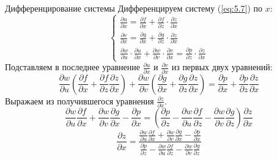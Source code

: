 \begin{tbox}{Дифференцирование системы}
	Дифференцируем систему (\ref{eq:5.7}) по $x$:
	\begin{equation*}
		\begin{cases}
			\frac{\partial u}{\partial x} = \frac{\partial f}{\partial x} + \frac{\partial f}{\partial z} \cdot \frac{\partial z}{\partial x} \\
			\frac{\partial v}{\partial x} = \frac{\partial g}{\partial x} + \frac{\partial g}{\partial z} \cdot \frac{\partial z}{\partial x} \\
			\frac{\partial w}{\partial u} \cdot \frac{\partial u}{\partial x} + \frac{\partial w}{\partial v} \cdot \frac{\partial v}{\partial x} = \frac{\partial p}{\partial z} \cdot \frac{\partial z}{\partial x}
		\end{cases}
	\end{equation*}
	Подставляем в последнее уравнение $\frac{\partial u}{\partial x}$ и $\frac{\partial v}{\partial x}$ из первых двух уравнений:
	\begin{equation*}
		\frac{\partial w}{\partial u} \left(\frac{\partial f}{\partial x} + \frac{\partial f}{\partial z} \frac{\partial z}{\partial x}\right) + \frac{\partial w }{\partial v}\left(\frac{\partial g}{\partial x} + \frac{\partial g}{\partial z} \frac{\partial z}{\partial x}\right) = \frac{\partial p}{\partial x} + \frac{\partial p}{\partial z} \frac{\partial z}{\partial x}
	\end{equation*}
	Выражаем из получившегося уравнения $\frac{\partial z}{\partial x}$.
	\begin{equation*}
		\frac{\partial w}{\partial u} \frac{\partial f}{\partial x} + \frac{\partial w}{\partial v} \frac{\partial g}{\partial x} - \frac{\partial p}{\partial x} = \left(\frac{\partial p}{\partial z} - \frac{\partial w}{\partial u} \frac{\partial f}{\partial z} - \frac{\partial w}{\partial v} \frac{\partial g}{\partial z}\right) \frac{\partial z}{\partial x}
	\end{equation*}
	\begin{equation} \label{eq:5.8}
		\frac{\partial z}{\partial x} = \frac{\displaystyle\frac{\partial w}{\partial u} \frac{\partial f}{\partial x} + \frac{\partial w}{\partial v} \frac{\partial g}{\partial x} - \frac{\partial p}{\partial x}}{\displaystyle\frac{\partial p}{\partial z} - \frac{\partial w}{\partial u} \frac{\partial f}{\partial z} - \frac{\partial w}{\partial v} \frac{\partial g}{\partial z}}
	\end{equation}


\end{tbox}
